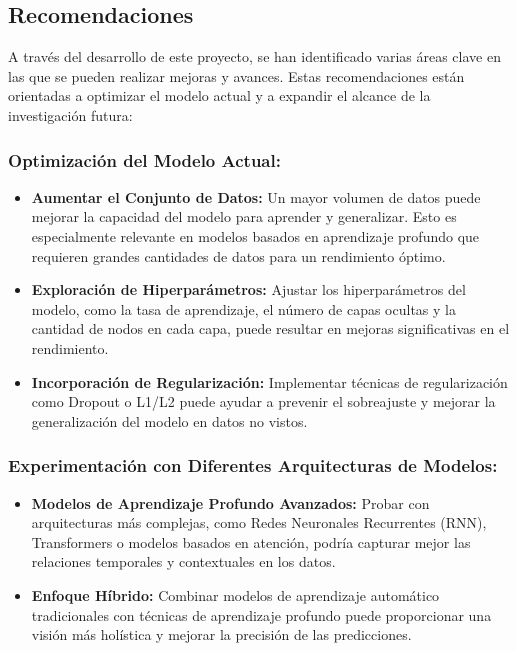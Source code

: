 \subsection{Recomendaciones}

A través del desarrollo de este proyecto, se han identificado varias áreas clave en las que se pueden realizar mejoras y avances. Estas recomendaciones están orientadas a optimizar el modelo actual y a expandir el alcance de la investigación futura:

\subsubsection{Optimización del Modelo Actual:}
\begin{itemize}
    \item \textbf{Aumentar el Conjunto de Datos:} Un mayor volumen de datos puede mejorar la capacidad del modelo para aprender y generalizar. Esto es especialmente relevante en modelos basados en aprendizaje profundo que requieren grandes cantidades de datos para un rendimiento óptimo.
    \item \textbf{Exploración de Hiperparámetros:} Ajustar los hiperparámetros del modelo, como la tasa de aprendizaje, el número de capas ocultas y la cantidad de nodos en cada capa, puede resultar en mejoras significativas en el rendimiento.
    \item \textbf{Incorporación de Regularización:} Implementar técnicas de regularización como Dropout o L1/L2 puede ayudar a prevenir el sobreajuste y mejorar la generalización del modelo en datos no vistos.
\end{itemize}

\subsubsection{Experimentación con Diferentes Arquitecturas de Modelos:}
\begin{itemize}
    \item \textbf{Modelos de Aprendizaje Profundo Avanzados:} Probar con arquitecturas más complejas, como Redes Neuronales Recurrentes (RNN), Transformers o modelos basados en atención, podría capturar mejor las relaciones temporales y contextuales en los datos.
    \item \textbf{Enfoque Híbrido:} Combinar modelos de aprendizaje automático tradicionales con técnicas de aprendizaje profundo puede proporcionar una visión más holística y mejorar la precisión de las predicciones.
\end{itemize}

